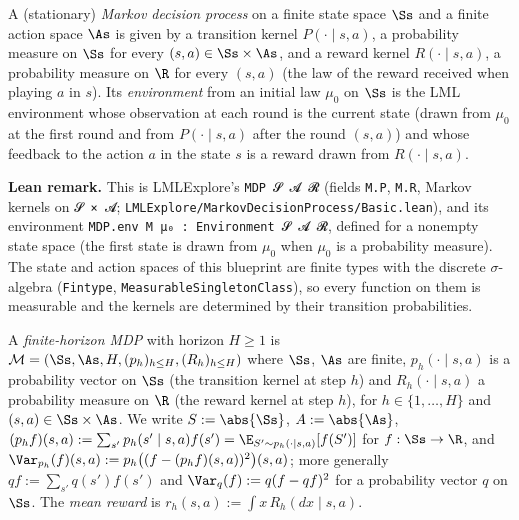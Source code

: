 \begin{definition}\label{def:mdp}
\leanok
A (stationary) \emph{Markov decision process} on a finite state space $\Ss$ and a finite action
space $\As$ is given by a transition kernel $P(\cdot \mid s, a)$, a probability measure on
$\Ss$ for every $(s, a) \in \Ss \times \As$, and a reward kernel $R(\cdot \mid s, a)$, a
probability measure on $\R$ for every $(s, a)$ (the law of the reward received when playing $a$
in $s$). Its \emph{environment} from an initial law $\mu_0$ on $\Ss$ is the LML environment
whose observation at each round is the current state (drawn from $\mu_0$ at the first round
and from $P(\cdot \mid s, a)$ after the round $(s, a)$) and whose feedback to the action $a$ in
the state $s$ is a reward drawn from $R(\cdot \mid s, a)$.
\end{definition}

\textbf{Lean remark.} This is LMLExplore's \texttt{MDP 𝓢 𝓐 𝓡} (fields \texttt{M.P},
\texttt{M.R}, Markov kernels on \texttt{𝓢 × 𝓐}; \texttt{LMLExplore/MarkovDecisionProcess/Basic.lean}),
and its environment \texttt{MDP.env M μ₀ : Environment 𝓢 𝓐 𝓡}, defined for a nonempty state
space (the first state is drawn from $\mu_0$ when $\mu_0$ is a probability measure). The state and action spaces of this
blueprint are finite types with the discrete $\sigma$-algebra (\texttt{Fintype},
\texttt{MeasurableSingletonClass}), so every function on them is measurable and the kernels are
determined by their transition probabilities.

\begin{definition}\label{def:episodic_mdp}
\leanok
{}
A \emph{finite-horizon MDP} with horizon $H \ge 1$ is
$\mathcal M = (\Ss, \As, H, (p_h)_{h \le H}, (R_h)_{h \le H})$ where $\Ss$, $\As$ are finite,
$p_h(\cdot \mid s, a)$ is a probability vector on $\Ss$ (the transition kernel at step $h$) and
$R_h(\cdot \mid s, a)$ a probability measure on $\R$ (the reward kernel at step $h$), for
$h \in \{1, \dots, H\}$ and $(s, a) \in \Ss \times \As$. We write $S := \abs{\Ss}$, $A := \abs{\As}$,
$(p_h f)(s, a) := \sum_{s'} p_h(s' \mid s, a) f(s') = \E_{S' \sim p_h(\cdot \mid s, a)}[f(S')]$
for $f : \Ss \to \R$, and $\Var_{p_h}(f)(s, a) := p_h\big((f - (p_h f)(s, a))^2\big)(s, a)$;
more generally $q f := \sum_{s'} q(s') f(s')$ and $\Var_q(f) := q(f - qf)^2$ for a probability
vector $q$ on $\Ss$. The \emph{mean reward} is $r_h(s, a) := \int x\, R_h(dx \mid s, a)$.
\end{definition}

